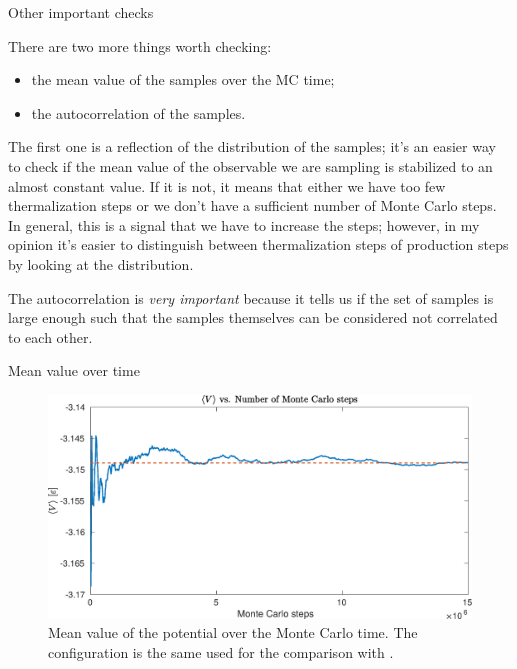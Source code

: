 \documentclass[10pt, compress, protectframetitle, handout]{beamer}
\begin{document}
\begin{frame}{Other important checks}

	There are two more things worth checking:
	\begin{itemize}
		\item the \alert{mean value} of the samples over the MC time;
		\item the \alert{autocorrelation} of the samples.
	\end{itemize}
	
	The first one is a reflection of the distribution of the samples; it's an easier way to check if the mean value of the observable we are sampling is stabilized to an almost constant value. If it is not, it means that either we have too few thermalization steps or we don't have a sufficient number of Monte Carlo steps. In general, this is a signal that we have to increase the steps; however, in my opinion it's easier to distinguish between thermalization steps of production steps by looking at the distribution.
	
	The autocorrelation is \emph{very important} because it tells us if the set of samples is large enough such that the samples themselves can be considered not correlated to each other. 

\end{frame}

\begin{frame}{Mean value over time}
	\begin{figure}
		\centering
		\includegraphics[width=\textwidth]{meanvalue_example}
		\caption{Mean value of the potential over the Monte Carlo time. The configuration is the same used for the comparison with \cite{Johnson1993}.}
		\label{fig:meanvalue_example}
	\end{figure}
\end{frame}
\end{document}
